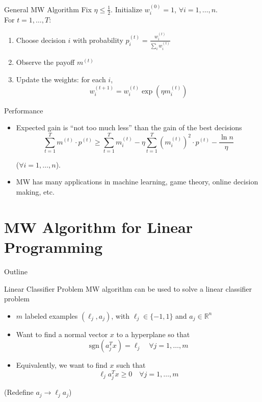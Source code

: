 \documentclass{beamer}
\begin{document}
\begin{frame}{General MW Algorithm}
Fix $\eta \leq \frac{1}{2}$. Initialize $w^{(0)}_i = 1$, $ \forall i = 1,\ldots,n$.\\ \vspace{.5cm}
For $t = 1,\ldots, T$:
\begin{enumerate}
\setlength\itemsep{1.2em}
\item Choose decision $i$ with probability $p_i^{(t)} = \frac{w_i^{(t)}}{\sum_i w_i^{(t)}}$
\item Observe the payoff $m^{(t)}$
\item Update the weights: for each $i$, $$w_i^{(t+1)} = w_i^{(t)}\exp(\eta m_i^{(t)})$$
\end{enumerate}
\end{frame}

\begin{frame}{Performance}
\begin{itemize}
\item Expected gain is ``not too much less'' than the gain of the best decisions 
$$
\sum_{t=1}^T m^{(t)}\cdot p^{(t)} \geq \sum_{t=1}^T m_i^{(t)} - \eta \sum_{t=1}^T (m_i^{(t)})^2\cdot p^{(t)} - \frac{\ln n}{\eta}
$$

($\forall i = 1, \dots, n$).
\item MW has many applications in machine learning, game theory, online decision making, etc. %
\end{itemize}
\end{frame}

\section[MW for LP]{MW Algorithm for Linear Programming}
\begin{frame}{Outline}
  \tableofcontents[currentsection]
\end{frame}

\begin{frame}{Linear Classifier Problem}
MW algorithm can be used to solve a linear classifier problem
\begin{itemize}
\item $m$ labeled examples $(\ell_j, a_j)$, with $\ell_j \in \{-1,1\}$ and $a_j \in \mathbb{R}^n$ 
\item Want to find a normal vector $x$ to a hyperplane so that $$\text{sgn}(a_j^Tx) = \ell_j \quad \forall j = 1, \dots, m$$
\item Equivalently, we want to find $x$ such that $$\ell_j a_j^Tx \geq 0 \quad \forall j = 1, \dots, m$$
\end{itemize}
(Redefine $a_j \to \ell_j a_j$)
\end{frame}
\end{document}
